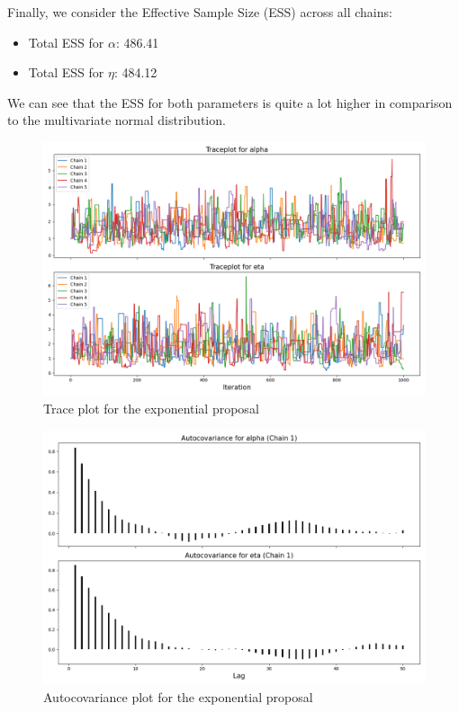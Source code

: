 \documentclass[9pt]{IEEEtran}
\begin{document}
Finally, we consider the Effective Sample Size (ESS) across all chains:
\begin{itemize}
    \item Total ESS for $\alpha$: 486.41
    \item Total ESS for $\eta$: 484.12
\end{itemize}

We can see that the ESS for both parameters is quite a lot higher in comparison to the multivariate 
normal distribution. 


    \begin{figure}[h]
        \centering
        \includegraphics[width=0.99\columnwidth]{figures/exp_trace.png}
        \caption{Trace plot for the exponential proposal}
        \label{fig:exp_trace}
    \end{figure}


        \begin{figure}[h]
        \centering
        \includegraphics[width=0.99\columnwidth]{figures/exp_cov.png}
        \caption{Autocovariance plot for the exponential proposal}
        \label{fig:exp_cov}
    \end{figure}
\end{document}
